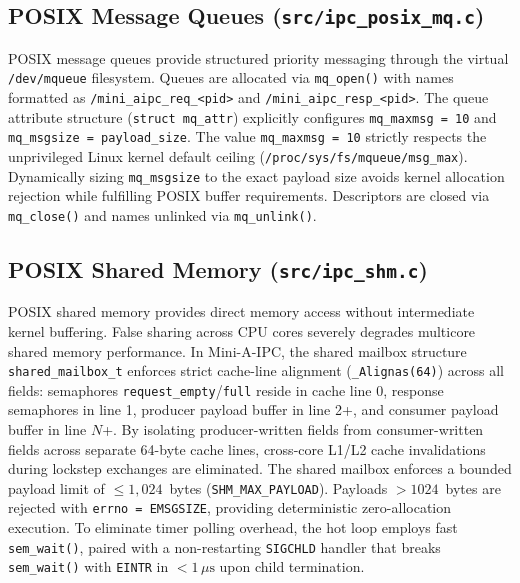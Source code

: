 \subsection{POSIX Message Queues (\texttt{src/ipc\_posix\_mq.c})}
POSIX message queues provide structured priority messaging through the virtual \texttt{/dev/mqueue} filesystem.
Queues are allocated via \texttt{mq\_open()} with names formatted as \texttt{/mini\_aipc\_req\_<pid>} and \texttt{/mini\_aipc\_resp\_<pid>}. The queue attribute structure (\texttt{struct mq\_attr}) explicitly configures \texttt{mq\_maxmsg = 10} and \texttt{mq\_msgsize = payload\_size}. The value \texttt{mq\_maxmsg = 10} strictly respects the unprivileged Linux kernel default ceiling (\texttt{/proc/sys/fs/mqueue/msg\_max}). Dynamically sizing \texttt{mq\_msgsize} to the exact payload size avoids kernel allocation rejection while fulfilling POSIX buffer requirements. Descriptors are closed via \texttt{mq\_close()} and names unlinked via \texttt{mq\_unlink()}.

\subsection{POSIX Shared Memory (\texttt{src/ipc\_shm.c})}
POSIX shared memory provides direct memory access without intermediate kernel buffering.
False sharing across CPU cores severely degrades multicore shared memory performance. In Mini-A-IPC, the shared mailbox structure \texttt{shared\_mailbox\_t} enforces strict cache-line alignment (\texttt{\_Alignas(64)}) across all fields: semaphores \texttt{request\_empty}/\texttt{full} reside in cache line 0, response semaphores in line 1, producer payload buffer in line 2+, and consumer payload buffer in line $N$+. By isolating producer-written fields from consumer-written fields across separate 64-byte cache lines, cross-core L1/L2 cache invalidations during lockstep exchanges are eliminated.
The shared mailbox enforces a bounded payload limit of $\le 1,024$~bytes (\texttt{SHM\_MAX\_PAYLOAD}). Payloads $> 1024$~bytes are rejected with \texttt{errno = EMSGSIZE}, providing deterministic zero-allocation execution.
To eliminate timer polling overhead, the hot loop employs fast \texttt{sem\_wait()}, paired with a non-restarting \texttt{SIGCHLD} handler that breaks \texttt{sem\_wait()} with \texttt{EINTR} in $< 1\,\mu\text{s}$ upon child termination.


